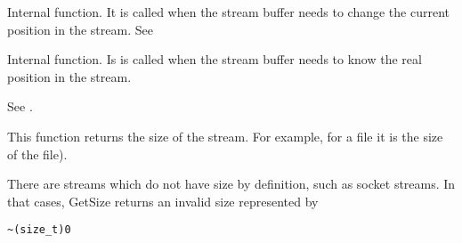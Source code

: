 

Internal function. It is called when the stream buffer needs to change the
current position in the stream. See 



Internal function. Is is called when the stream buffer needs to know the
real position in the stream.



See .



This function returns the size of the stream. For example, for a file it is the size of
the file).


There are streams which do not have size by definition, such as socket streams.
In that cases, GetSize returns an invalid size represented by

\begin{verbatim}
~(size_t)0
\end{verbatim}

